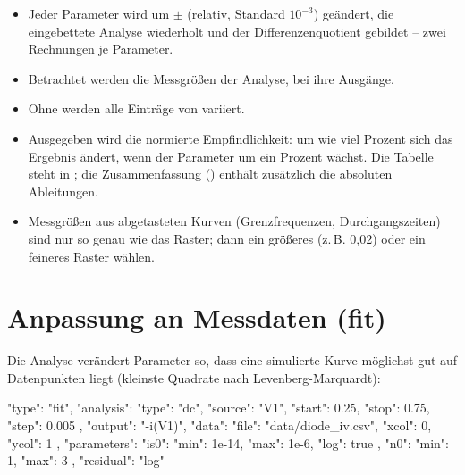 \begin{itemize}
  \item Jeder Parameter wird um $\pm$ (relativ, Standard
    $10^{-3}$) geändert, die eingebettete Analyse wiederholt und der
    Differenzenquotient gebildet – zwei Rechnungen je Parameter.
  \item Betrachtet werden die Messgrößen der Analyse, bei  ihre
    Ausgänge.
  \item Ohne  werden alle Einträge von 
    variiert.
  \item Ausgegeben wird die normierte Empfindlichkeit: um wie viel Prozent
    sich das Ergebnis ändert, wenn der Parameter um ein Prozent wächst. Die
    Tabelle steht in ; die Zusammenfassung
    () enthält zusätzlich die absoluten Ableitungen.
  \item Messgrößen aus abgetasteten Kurven (Grenzfrequenzen,
    Durchgangszeiten) sind nur so genau wie das Raster; dann ein größeres
     (z.\,B. 0,02) oder ein feineres Raster wählen.
\end{itemize}

\section{Anpassung an Messdaten (fit)}

Die Analyse  verändert Parameter so, dass eine simulierte Kurve
möglichst gut auf Datenpunkten liegt (kleinste Quadrate nach
Levenberg-Marquardt):

\begin{json}
{ "type": "fit",
  "analysis": { "type": "dc", "source": "V1", "start": 0.25, "stop": 0.75, "step": 0.005 },
  "output": "-i(V1)",
  "data": { "file": "data/diode_iv.csv", "xcol": 0, "ycol": 1 },
  "parameters": { "is0": { "min": 1e-14, "max": 1e-6, "log": true },
                  "n0":  { "min": 1, "max": 3 } },
  "residual": "log" }
\end{json}

